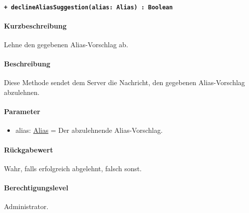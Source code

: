\paragraph{\texttt{+ declineAliasSuggestion(alias: Alias) : Boolean}}\label{AP_Backend_declineAliasSuggestion}%
\paragraph*{Kurzbeschreibung}
Lehne den gegebenen Alias-Vorschlag ab.
\paragraph*{Beschreibung}
Diese Methode sendet dem Server die Nachricht, den gegebenen Alias-Vorschlag abzulehnen.
\paragraph*{Parameter}
\begin{itemize}
    \item alias: \hyperref[AP_Alias]{Alias} = Der abzulehnende Alias-Vorschlag.
\end{itemize}
\paragraph*{Rückgabewert}
Wahr, falls erfolgreich abgelehnt, falsch sonst.
\paragraph*{Berechtigungslevel}
Administrator.
